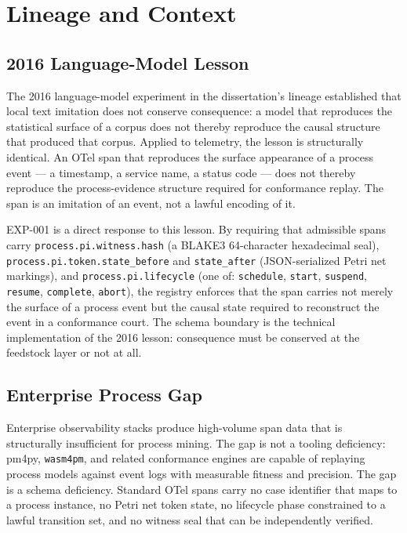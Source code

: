 
\section{Lineage and Context}
\label{sec:otel-weaver-exp-001-custom-pi-registry-lineage}

\subsection{2016 Language-Model Lesson}
\label{sec:otel-weaver-exp-001-custom-pi-registry-lineage-2016}

The 2016 language-model experiment in the dissertation's lineage established that local text
imitation does not conserve consequence: a model that reproduces the statistical surface of a
corpus does not thereby reproduce the causal structure that produced that corpus. Applied to
telemetry, the lesson is structurally identical. An OTel span that reproduces the surface
appearance of a process event --- a timestamp, a service name, a status code --- does not thereby
reproduce the process-evidence structure required for conformance replay. The span is an imitation
of an event, not a lawful encoding of it.

EXP-001 is a direct response to this lesson. By requiring that admissible spans carry
\texttt{process.pi.witness.hash} (a BLAKE3 64-character hexadecimal seal),
\texttt{process.pi.token.state\_before} and \texttt{state\_after} (JSON-serialized Petri net
markings), and \texttt{process.pi.lifecycle} (one of: \texttt{schedule}, \texttt{start},
\texttt{suspend}, \texttt{resume}, \texttt{complete}, \texttt{abort}), the registry enforces that
the span carries not merely the surface of a process event but the causal state required to
reconstruct the event in a conformance court. The schema boundary is the technical implementation
of the 2016 lesson: consequence must be conserved at the feedstock layer or not at all.

\subsection{Enterprise Process Gap}
\label{sec:otel-weaver-exp-001-custom-pi-registry-lineage-enterprise}

Enterprise observability stacks produce high-volume span data that is structurally insufficient for
process mining. The gap is not a tooling deficiency: pm4py, \texttt{wasm4pm}, and related
conformance engines are capable of replaying process models against event logs with measurable
fitness and precision. The gap is a schema deficiency. Standard OTel spans carry no case
identifier that maps to a process instance, no Petri net token state, no lifecycle phase
constrained to a lawful transition set, and no witness seal that can be independently verified.

